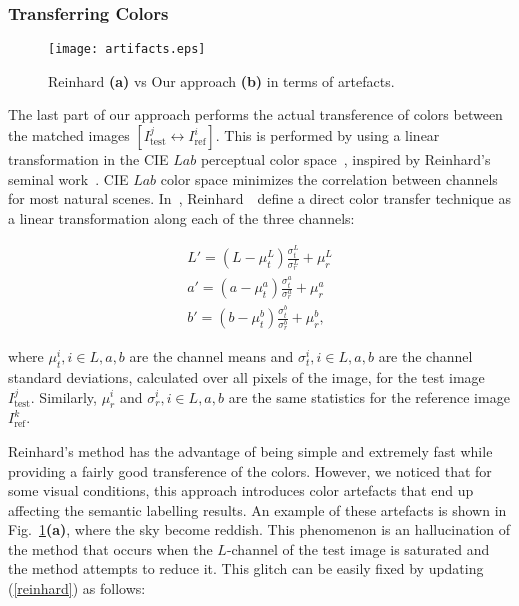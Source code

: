 \subsubsection{Transferring Colors}
\label{subsubsect:preproc}

\begin{figure}[!t]
    \centering
    \texttt{[image: artifacts.eps]}
    \caption[Example of Reinhard vs our approach in terms of artefacts.]{Reinhard \textbf{(a)} vs Our approach \textbf{(b)} in terms of artefacts.}
    \label{fig:artefacts}
\end{figure}

The last part of our approach performs the actual transference of
colors between the matched images $[I^j_\text{test} \leftrightarrow
I^i_{\text{ref}} ]$. This is performed by using a linear
transformation in the CIE $Lab$ perceptual color
space~\cite{Gonzalez:2002}, inspired by Reinhard's seminal
work~\cite{Reinhard:2001}. CIE $Lab$ color space minimizes the
correlation between channels for most natural scenes.
In~\cite{Reinhard:2001}, Reinhard~\etal~define a direct color
transfer technique as a linear transformation along each of the
three channels:

\begin{ceqn}
\begin{align}
\label{reinhard}
L'=(L-\mu^L_t)\frac{\sigma^L_t}{\sigma^L_r}+\mu^L_r \nonumber\\
a'=(a-\mu^a_t)\frac{\sigma^a_t}{\sigma^a_r}+\mu^a_r \\
b'=(b-\mu^b_t)\frac{\sigma^b_t}{\sigma^b_r}+\mu^b_r, \nonumber
\end{align}
\end{ceqn}

\noindent where $\mu^i_t, i\in{L,a,b}$ are the channel means and
$\sigma^i_t, i\in{L,a,b}$ are the channel standard deviations,
calculated over all pixels of the image, for the test image
$I^j_\text{test}$. Similarly, $\mu^i_r$ and $\sigma^i_r,
i\in{L,a,b}$ are the same statistics for the reference image
$I_{\text{ref}}^k$.

Reinhard's method has the advantage of being simple and extremely
fast while providing a fairly good transference of the colors.
However, we noticed that for some visual conditions, this approach
introduces color artefacts that end up affecting the semantic
labelling results. An example of these artefacts is shown in
Fig.~\ref{fig:artefacts}\textbf{(a)}, where the sky become
reddish. This phenomenon is an hallucination of the method that
occurs when the $L$-channel of the test image is saturated and the
method attempts to reduce it. This glitch can be easily fixed by
updating (\ref{reinhard}) as follows:

